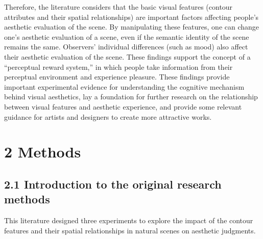 \documentclass[
  man,floatsintext]{apa6}
\begin{document}
Therefore, the literature considers that the basic visual features (contour attributes and their spatial relationships) are important factors affecting people's aesthetic evaluation of the scene. By manipulating these features, one can change one's aesthetic evaluation of a scene, even if the semantic identity of the scene remains the same. Observers' individual differences (such as mood) also affect their aesthetic evaluation of the scene. These findings support the concept of a ``perceptual reward system,'' in which people take information from their perceptual environment and experience pleasure. These findings provide important experimental evidence for understanding the cognitive mechanism behind visual aesthetics, lay a foundation for further research on the relationship between visual features and aesthetic experience, and provide some relevant guidance for artists and designers to create more attractive works.

\section{2 Methods}\label{methods}

\subsection{2.1 Introduction to the original research methods}\label{introduction-to-the-original-research-methods}

This literature designed three experiments to explore the impact of the contour features and their spatial relationships in natural scenes on aesthetic judgments.
\end{document}
